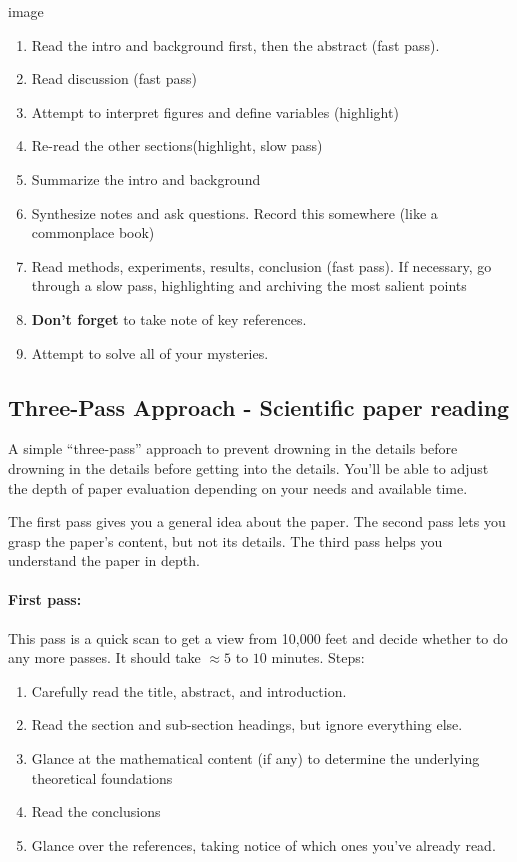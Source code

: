  image

\begin{enumerate}
\item Read the intro and background first, then the abstract (fast pass).
\item Read discussion (fast pass)
\item Attempt to interpret figures and define variables (highlight)
\item Re-read the other sections(highlight, slow pass)
\item Summarize the intro and background
\item Synthesize notes and ask questions. Record this somewhere (like a commonplace book)
\item Read methods, experiments, results, conclusion (fast pass). If necessary, go through a slow pass, highlighting and archiving the most salient points
\item \textbf{Don't forget} to take note of key references.
\item Attempt to solve all of your mysteries.
\end{enumerate}

\subsection{Three-Pass Approach - Scientific paper reading}

A simple ``three-pass'' approach to prevent drowning in the details before drowning in the details before getting into the details. You'll be able to adjust the depth of paper evaluation depending on your needs and available time. 

The first pass gives you a general idea about the paper. The second pass lets you grasp the paper's content, but not its details. The third pass helps you understand the paper in depth. 

\paragraph*{First pass: }This pass is a quick scan to get a view from 10,000 feet and decide whether to do any more passes. It should take $\approx 5$ to $10$ minutes.
Steps: \begin{enumerate}
	\item Carefully read the title, abstract, and introduction.
	\item Read the section and sub-section headings, but ignore everything else.
	\item Glance at the mathematical content (if any) to determine the underlying theoretical foundations
	\item Read the conclusions
	\item Glance over the references, taking notice of which ones you've already read. 
\end{enumerate}

